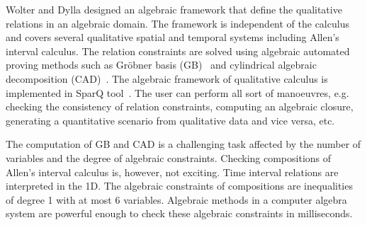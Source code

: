 \documentclass{llncs}
\begin{document}

Wolter and Dylla \cite{Wolter:2012,Dylla:2013} designed an algebraic framework that define the qualitative relations in an algebraic domain. The framework is independent of the calculus and 
 covers several qualitative spatial and temporal systems including Allen's interval calculus. %
 The relation constraints are solved using algebraic automated proving methods such as Gr\"{o}bner basis (GB)~\cite{Buchberger:1985} and cylindrical algebraic decomposition (CAD)~\cite{Collins:1996}. %
 The algebraic framework of qualitative calculus is implemented in SparQ tool~\cite{Wallgrun:2007}. The user can perform all sort of manoeuvres, e.g. checking the consistency of relation constraints, computing an algebraic closure, generating a quantitative scenario from qualitative data and vice versa, etc. %
 

The computation of GB and CAD is a challenging task affected by the number of variables and the degree of algebraic constraints. Checking compositions  of Allen's interval calculus is, however, not exciting.  Time interval relations are interpreted in the 1D. The algebraic constraints of compositions are inequalities of degree 1 with at most 6 variables. %
Algebraic methods in a computer algebra system are powerful enough to check these algebraic constraints in milliseconds.
\end{document}
